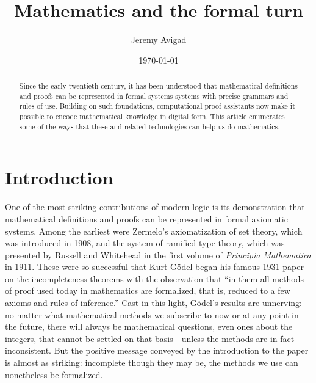 \documentclass[12pt]{amsart}
\theoremstyle{definition}
\theoremstyle{remark}
\numberwithin{equation}{section}
\begin{document}
\title{Mathematics and the formal turn}

\author{Jeremy Avigad}
\address{Department of Philosophy and Department of Mathematical Sciences, Baker Hall 161, Carnegie Mellon University, Pittsburgh, PA 15213, USA}
\curraddr{}


\date{\today}


\begin{abstract}
Since the early twentieth century, it has been understood that mathematical definitions and proofs can be represented in formal systems systems with precise grammars and rules of use. Building on such foundations, computational proof assistants now make it possible to encode mathematical knowledge in digital form. This article enumerates some of the ways that these and related technologies can help us do mathematics.
\end{abstract}

\maketitle

\section*{Introduction}

One of the most striking contributions of modern logic is its demonstration that mathematical definitions and proofs can be represented in formal axiomatic systems. Among the earliest were Zermelo's axiomatization of set theory, which was introduced in 1908, and the system of ramified type theory, which was presented by Russell and Whitehead in the first volume of \emph{Principia Mathematica} in 1911. These were so successful that Kurt G\"odel began his famous 1931 paper on the incompleteness theorems with the observation that ``in them all methods of proof used today in mathematics are formalized, that is, reduced to a few axioms and rules of inference.'' Cast in this light, G\"odel's results are unnerving: no matter what mathematical methods we subscribe to now or at any point in the future, there will always be mathematical questions, even ones about the integers, that cannot be settled on that basis---unless the methods are in fact inconsistent. But the positive message conveyed by the introduction to the paper is almost as striking: incomplete though they may be, the methods we use can nonetheless be formalized.
\end{document}
